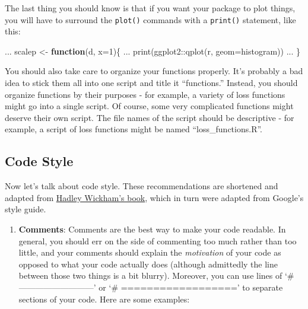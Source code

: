 \documentclass[
]{book}
\newenvironment{Shaded}{\begin{snugshade}}{\end{snugshade}}
\newcommand{\AttributeTok}[1]{\textcolor[rgb]{0.77,0.63,0.00}{#1}}
\newcommand{\ControlFlowTok}[1]{\textcolor[rgb]{0.13,0.29,0.53}{\textbf{#1}}}
\newcommand{\DecValTok}[1]{\textcolor[rgb]{0.00,0.00,0.81}{#1}}
\newcommand{\FunctionTok}[1]{\textcolor[rgb]{0.00,0.00,0.00}{#1}}
\newcommand{\NormalTok}[1]{#1}
\newcommand{\OtherTok}[1]{\textcolor[rgb]{0.56,0.35,0.01}{#1}}
\newcommand{\SpecialCharTok}[1]{\textcolor[rgb]{0.00,0.00,0.00}{#1}}
\newcommand{\StringTok}[1]{\textcolor[rgb]{0.31,0.60,0.02}{#1}}
\providecommand{\tightlist}{%
  \setlength{\itemsep}{0pt}\setlength{\parskip}{0pt}}
\begin{document}
The last thing you should know is that if you want your package to plot things, you will have to surround the \texttt{plot()} commands with a \texttt{print()} statement, like this:

\begin{Shaded}
\begin{Highlighting}[]
\NormalTok{ ...}
\NormalTok{scalep }\OtherTok{\textless{}{-}} \ControlFlowTok{function}\NormalTok{(d, }\AttributeTok{x=}\DecValTok{1}\NormalTok{)\{}
\NormalTok{ ...}
  \FunctionTok{print}\NormalTok{(ggplot2}\SpecialCharTok{::}\FunctionTok{qplot}\NormalTok{(r, }\AttributeTok{geom=}\StringTok{\textquotesingle{}histogram\textquotesingle{}}\NormalTok{))}
\NormalTok{ ...}
\NormalTok{\}}
\end{Highlighting}
\end{Shaded}

You should also take care to organize your functions properly. It's probably a bad idea to stick them all into one script and title it ``functions.'' Instead, you should organize functions by their purposes - for example, a variety of loss functions might go into a single script. Of course, some very complicated functions might deserve their own script. The file names of the script should be descriptive - for example, a script of loss functions might be named ``loss\_functions.R''.

\hypertarget{code-style}{%
\subsection{Code Style}\label{code-style}}

Now let's talk about code style. These recommendations are shortened and adapted from \href{http://r-pkgs.had.co.nz/r.html}{Hadley Wickham's book}, which in turn were adapted from Google's style guide.

\begin{enumerate}
\def\labelenumi{\arabic{enumi}.}
\tightlist
\item
  \textbf{Comments}: Comments are the best way to make your code readable. In general, you should err on the side of commenting too much rather than too little, and your comments should explain the \emph{motivation} of your code as opposed to what your code actually does (although admittedly the line between those two things is a bit blurry). Moreover, you can use lines of `\# ---------------------------' or `\# ==================' to separate sections of your code. Here are some examples:
\end{enumerate}
\end{document}
